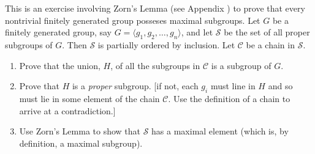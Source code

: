 \begin{exercise}
    This is an exercise involving Zorn's Lemma (see Appendix \MakeUppercase{}) to prove that every nontrivial finitely generated group posseses maximal subgroups. Let $G$ be a finitely generated group, say $G = \langle g_1,g_2,\dots ,g_n \rangle$, and let $\mathcal{S}$ be the set of all proper subgroups of $G$. Then $\mathcal{S}$ is partially ordered by inclusion. Let $\mathcal{C}$ be a chain in $\mathcal{S}$.
    \begin{enumerate}[label = \textbf{(\alph*)}]
        \item Prove that the union, $H$, of all the subgroups in $\mathcal{C}$ is a subgroup of $G$.
        \item Prove that $H$ is a \textit{proper} subgroup. [if not, each $g_i$ must line in $H$ and so must lie in some element of the chain $\mathcal{C}$. Use the definition of a chain to arrive at a contradiction.]
        \item Use Zorn's Lemma to show that $\mathcal{S}$ has a maximal element (which is, by definition, a maximal subgroup).
    \end{enumerate}
\end{exercise}

